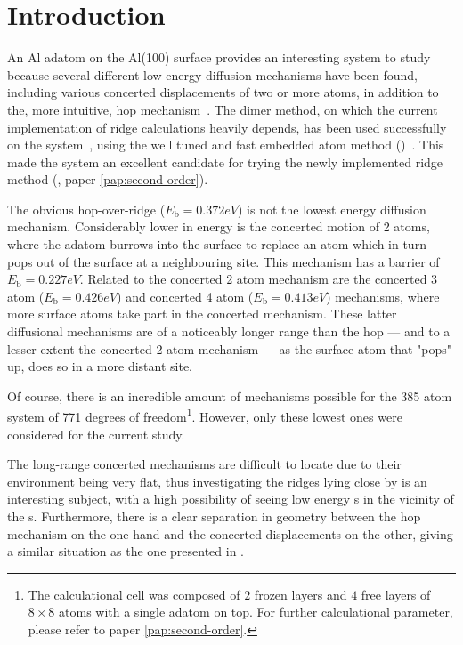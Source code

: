 \section{Introduction}
\label{sec:al-introduction}
An Al adatom on the Al(100) surface provides an interesting system to study because several different low energy diffusion mechanisms have been found, including various concerted displacements of two or more atoms, in addition to the, more intuitive, hop mechanism~\cite{concerted-motion-1990, dimer-original-1999, ts-opt-2001}.
The dimer method, on which the current implementation of ridge calculations heavily depends, has been used successfully on the system~\cite{dimer-original-1999}, using the well tuned and fast embedded atom method ()~\cite{eam-1983, eam-1986}.
This made the system an excellent candidate for trying the newly implemented ridge method (, paper \ref{pap:second-order}).

The obvious hop-over-ridge ($E_\text{b} = 0.372\unit{eV}$) is not the lowest energy diffusion mechanism.
Considerably lower in energy is the concerted motion of 2 atoms, where the adatom burrows into the surface to replace an atom which in turn pops out of the surface at a neighbouring site.
This mechanism has a barrier of $E_\text{b} = 0.227\unit{eV}$.
Related to the concerted 2 atom mechanism are the concerted 3 atom ($E_\text{b} = 0.426\unit{eV}$) and concerted 4 atom ($E_\text{b} = 0.413\unit{eV}$) mechanisms, where more surface atoms take part in the concerted mechanism.
These latter diffusional mechanisms are of a noticeably longer range than the hop --- and to a lesser extent the concerted 2 atom mechanism --- as the surface atom that "pops" up, does so in a more distant site.

Of course, there is an incredible amount of mechanisms possible for the 385 atom system of 771 degrees of freedom\footnote{The calculational cell was composed of $2$ frozen layers and $4$ free layers of $8\times 8$ atoms with a single adatom on top. For further calculational parameter, please refer to paper \ref{pap:second-order}.}.
However, only these lowest ones were considered for the current study.

The long-range concerted mechanisms are difficult to locate due to their environment being very flat, thus investigating the ridges lying close by is an interesting subject, with a high possibility of seeing low energy s in the vicinity of the s.
Furthermore, there is a clear separation in geometry between the hop mechanism on the one hand and the concerted displacements on the other, giving a similar situation as the one presented in .
